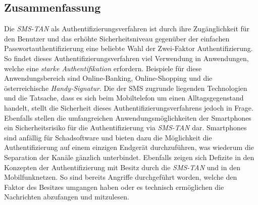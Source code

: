 \documentclass[11pt,a4paper,ngerman]{scrreprt}
\begin{document}
\subsection{Zusammenfassung}
Die \textit{SMS-TAN} als Authentifizierungsverfahren ist durch ihre Zugänglichkeit für den Benutzer und das erhöhte Sicherheitsniveau gegenüber der einfachen Passwortauthentifizierung eine beliebte Wahl der Zwei-Faktor Authentifizierung. So findet dieses Authentifizierungsverfahren viel Verwendung in Anwendungen, welche eine \emph{starke Authentifikation} erfordern. Beispiele für diese Anwendungsbereich sind Online-Banking, Online-Shopping und die österreichische \textit{Handy-Signatur}. Die der SMS zugrunde liegenden Technologien und die Tatsache, dass es sich beim Mobiltelefon um einen Alltagsgegenstand handelt, stellt die Sicherheit dieses Authentifizierungsverfahrens jedoch in Frage. Ebenfalls stellen die umfangreichen Anwendungsmöglichkeiten der Smartphones ein Sicherheitsrisiko für die Authentifizierung via \textit{SMS-TAN} dar. Smartphones sind anfällig für Schadsoftware und bieten dazu die Möglichkeit die Authentifizierung auf einem einzigen Endgerät durchzuführen, was wiederum die Separation der Kanäle gänzlich unterbindet. Ebenfalls zeigen sich Defizite in den Konzepten der Authentifizierung mit Besitz durch die \textit{SMS-TAN} und in den Mobilfunknetzen. So sind bereits Angriffe durchgeführt worden, welche den Faktor des Besitzes umgangen haben oder es technisch ermöglichen die Nachrichten abzufangen und mitzulesen.
\end{document}
